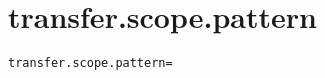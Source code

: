 \section{transfer.scope.pattern}
\label{configuration:TransferScopePattern}
\ClearAPI
\TODO
\begin{lstlisting}[style=Props,caption={Usage example for \textit{transfer.scope.pattern}}]
transfer.scope.pattern=
\end{lstlisting}